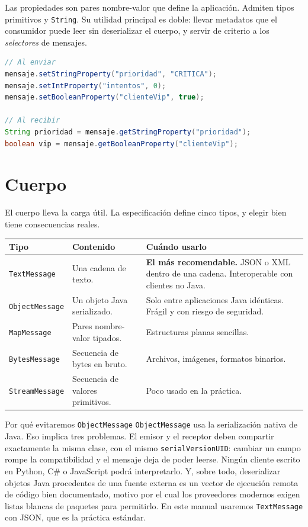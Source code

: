 \documentclass[11pt,a4paper]{book}
\newcommand{\clase}[1]{\texttt{#1}}
\begin{document}
Las propiedades son pares nombre-valor que define la aplicación.
Admiten tipos primitivos y \clase{String}.
Su utilidad principal es doble: llevar metadatos que el consumidor puede leer sin deserializar el cuerpo, y servir de criterio a los \emph{selectores} de mensajes.

\begin{lstlisting}[language=Java,caption={Escritura y lectura de propiedades},label={lst:props}]
// Al enviar
mensaje.setStringProperty("prioridad", "CRITICA");
mensaje.setIntProperty("intentos", 0);
mensaje.setBooleanProperty("clienteVip", true);

// Al recibir
String prioridad = mensaje.getStringProperty("prioridad");
boolean vip = mensaje.getBooleanProperty("clienteVip");
\end{lstlisting}

\section{Cuerpo}

El cuerpo lleva la carga útil.
La especificación define cinco tipos, y elegir bien tiene consecuencias reales.

\begin{center}
	\small
	\begin{tabularx}{\textwidth}{@{}p{3.2cm}Xp{3.6cm}@{}}
		\toprule
		\textbf{Tipo} & \textbf{Contenido} & \textbf{Cuándo usarlo} \\
		\midrule
		\clase{TextMessage}   & Una cadena de texto. & \textbf{El más recomendable.} JSON o XML dentro de una cadena. Interoperable con clientes no Java. \\
		\clase{ObjectMessage} & Un objeto Java serializado. & Solo entre aplicaciones Java idénticas. Frágil y con riesgo de seguridad. \\
		\clase{MapMessage}    & Pares nombre-valor tipados. & Estructuras planas sencillas. \\
		\clase{BytesMessage}  & Secuencia de bytes en bruto. & Archivos, imágenes, formatos binarios. \\
		\clase{StreamMessage} & Secuencia de valores primitivos. & Poco usado en la práctica. \\
		\bottomrule
	\end{tabularx}
\end{center}

\begin{cajaAviso}{Por qué evitaremos \clase{ObjectMessage}}
	\clase{ObjectMessage} usa la serialización nativa de Java.
	Eso implica tres problemas.
	El emisor y el receptor deben compartir exactamente la misma clase, con el mismo \texttt{serialVersionUID}: cambiar un campo rompe la compatibilidad y el mensaje deja de poder leerse.
	Ningún cliente escrito en Python, C\# o JavaScript podrá interpretarlo.
	Y, sobre todo, deserializar objetos Java procedentes de una fuente externa es un vector de ejecución remota de código bien documentado, motivo por el cual los proveedores modernos exigen listas blancas de paquetes para permitirlo.
	En este manual usaremos \clase{TextMessage} con JSON, que es la práctica estándar.
\end{cajaAviso}
\end{document}
